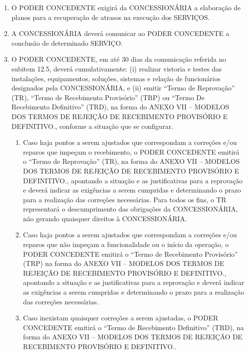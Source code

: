 \documentclass[a4paper,11pt]{report} %
\begin{document}
\begin{enumerate}
\item \label{itm:2WHY}	O PODER CONCEDENTE exigirá da CONCESSIONÁRIA a elaboração de planos para a recuperação de atrasos na execução dos SERVIÇOS.

\item \label{itm:HQSW}	 A CONCESSIONÁRIA deverá comunicar ao PODER CONCEDENTE a conclusão de determinado SERVIÇO.

\item \label{itm:MRRW}	 O PODER CONCEDENTE, em até 30 dias da comunicação referida no subitem 12.5, deverá cumulativamente: (i) realizar vistoria e testes das instalações, equipamentos, soluções, sistemas e relação de funcionários designados pela CONCESSIONÁRIA, e (ii) emitir “Termo de Reprovação” (TR), “Termo de Recebimento Provisório” (TRP) ou “Termo De Recebimento Definitivo” (TRD), na forma do ANEXO VII – MODELOS DOS TERMOS DE REJEIÇÃO DE RECEBIMENTO PROVISÓRIO E DEFINITIVO., conforme a situação que se configurar.

\begin{enumerate}[label*=\arabic*.]
\item \label{itm:} Caso haja pontos a serem ajustados que correspondam a correções e/ou reparos que impeçam o recebimento, o PODER CONCEDENTE emitirá o “Termo de Reprovação” (TR), na forma do ANEXO VII – MODELOS DOS TERMOS DE REJEIÇÃO DE RECEBIMENTO PROVISÓRIO E DEFINITIVO., apontando a situação e as justificativas para a reprovação e deverá indicar as exigências a serem cumpridas e determinando o prazo para a realização das correções necessárias. Para todos os fins, o TR representará o descumprimento das obrigações da CONCESSIONÁRIA, não gerando quaisquer direitos à CONCESSIONÁRIA.
\item \label{itm:ZVHJ} Caso haja pontos a serem ajustados que correspondam a correções e/ou reparos que não impeçam a funcionalidade ou o início da operação, o PODER CONCEDENTE emitirá o “Termo de Recebimento Provisório” (TRP) na forma do ANEXO VII – MODELOS DOS TERMOS DE REJEIÇÃO DE RECEBIMENTO PROVISÓRIO E DEFINITIVO., apontando a situação e as justificativas para a reprovação e deverá indicar as exigências a serem cumpridas e determinando o prazo para a realização das correções necessárias.
\item \label{itm:9RH4} Caso inexistam quaisquer correções a serem ajustadas, o PODER CONCEDENTE emitirá o “Termo de Recebimento Definitivo” (TRD), na forma do ANEXO VII – MODELOS DOS TERMOS DE REJEIÇÃO DE RECEBIMENTO PROVISÓRIO E DEFINITIVO..
\end{enumerate}


\end{enumerate}
\end{document}
